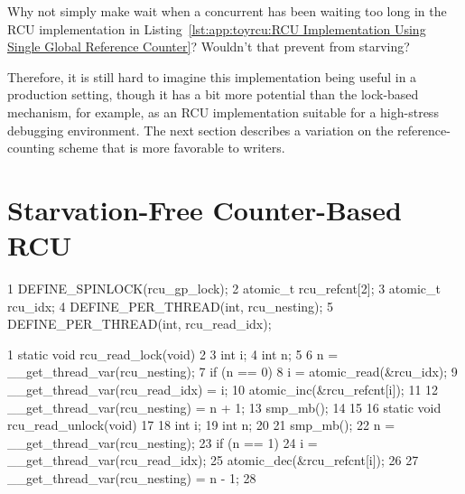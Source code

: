 \QuickQuiz{}
	Why not simply make  wait when a concurrent
	 has been waiting too long in
	the RCU implementation in
	Listing~\ref{lst:app:toyrcu:RCU Implementation Using Single Global Reference Counter}?
	Wouldn't that prevent  from starving?
 \QuickQuizEnd

Therefore, it is still hard to imagine this implementation being useful
in a production setting, though it has a bit more potential
than the lock-based mechanism, for example, as an RCU implementation
suitable for a high-stress debugging environment.
The next section describes a variation on the reference-counting
scheme that is more favorable to writers.

\section{Starvation-Free Counter-Based RCU}
\label{sec:app:toyrcu:Starvation-Free Counter-Based RCU}

\begin{listing}[tbp]
{ \scriptsize
\begin{verbbox}
  1 DEFINE_SPINLOCK(rcu_gp_lock);
  2 atomic_t rcu_refcnt[2];
  3 atomic_t rcu_idx;
  4 DEFINE_PER_THREAD(int, rcu_nesting);
  5 DEFINE_PER_THREAD(int, rcu_read_idx);
\end{verbbox}
}
\centering
\theverbbox
\caption{RCU Global Reference-Count Pair Data}
\label{lst:app:toyrcu:RCU Global Reference-Count Pair Data}
\end{listing}

\begin{listing}[tbp]
{ \scriptsize
\begin{verbbox}
  1 static void rcu_read_lock(void)
  2 {
  3   int i;
  4   int n;
  5
  6   n = __get_thread_var(rcu_nesting);
  7   if (n == 0) {
  8     i = atomic_read(&rcu_idx);
  9     __get_thread_var(rcu_read_idx) = i;
 10     atomic_inc(&rcu_refcnt[i]);
 11   }
 12   __get_thread_var(rcu_nesting) = n + 1;
 13   smp_mb();
 14 }
 15
 16 static void rcu_read_unlock(void)
 17 {
 18   int i;
 19   int n;
 20
 21   smp_mb();
 22   n = __get_thread_var(rcu_nesting);
 23   if (n == 1) {
 24      i = __get_thread_var(rcu_read_idx);
 25      atomic_dec(&rcu_refcnt[i]);
 26   }
 27   __get_thread_var(rcu_nesting) = n - 1;
 28 }
\end{verbbox}
}
\centering
\theverbbox
\caption{RCU Read-Side Using Global Reference-Count Pair}
\label{lst:app:toyrcu:RCU Read-Side Using Global Reference-Count Pair}
\end{listing}

